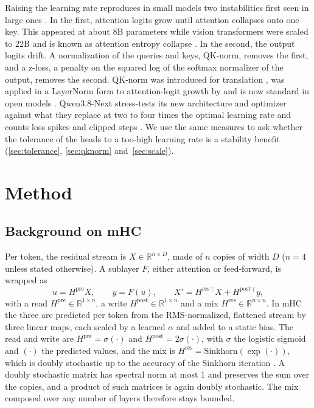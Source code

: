 \documentclass[11pt, a4paper]{article}
\newcommand{\Hpre}{H^{\mathrm{pre}}}
\newcommand{\Hpost}{H^{\mathrm{post}}}
\newcommand{\Hres}{H^{\mathrm{res}}}
\begin{document}
Raising the learning rate reproduces in small models two instabilities first seen in large ones \citep{wortsman2023proxies}. In
the first, attention logits grow until attention collapses onto one key. This appeared at about 8B parameters while vision
transformers were scaled to 22B \citep{dehghani2023vit22b} and is known as attention entropy collapse
\citep{zhai2023entropycollapse}. In the second, the output logits drift. A normalization of the queries and keys, QK-norm, removes
the first, and a z-loss, a penalty on the squared log of the softmax normalizer of the output, removes the second. QK-norm was introduced for translation \citep{henry2020qknorm}, was applied in a LayerNorm form
to attention-logit growth by \citet{dehghani2023vit22b} and is now standard in open models \citep{olmo2024olmo2, gemma2025gemma3,
yang2025qwen3}. Qwen3.8-Next stress-tests its new architecture and optimizer against what they replace at two to four
times the optimal learning rate and counts loss spikes and clipped steps \citep{qiu2026qwen38next}. We use the same measures to
ask whether the tolerance of the heads to a too-high learning rate is a stability benefit (\cref{sec:tolerance}, \cref{sec:qknorm}
and~\cref{sec:scale}).

\section{Method}
\label{sec:method}

\subsection{Background on mHC}
\label{sec:mhc}

Per token, the residual stream is $X \in \mathbb{R}^{n \times D}$, made of $n$ copies of width $D$ ($n = 4$ unless stated
otherwise). A sublayer $F$, either attention or feed-forward, is wrapped as
\begin{equation}
  u = \Hpre X, \qquad y = F(u), \qquad X' = \Hres{}^{\top} X + \Hpost{}^{\top} y,
  \label{eq:mhc}
\end{equation}
with a read $\Hpre \in \mathbb{R}^{1 \times n}$, a write $\Hpost \in \mathbb{R}^{1 \times n}$ and a mix $\Hres \in \mathbb{R}^{n
\times n}$. In mHC the three are predicted per token from the RMS-normalized, flattened stream by three linear maps, each scaled
by a learned $\alpha$ and added to a static bias. The read and write are $\Hpre = \sigma(\cdot)$ and $\Hpost = 2\sigma(\cdot)$,
with $\sigma$ the logistic sigmoid and $(\cdot)$ the predicted values, and the mix is $\Hres = \mathrm{Sinkhorn}(\exp(\cdot))$,
which is doubly stochastic up to the accuracy of the Sinkhorn iteration \citep{xie2026mhc}. A
doubly stochastic matrix has spectral norm at most 1 and preserves the sum over the copies, and a product of such matrices is
again doubly stochastic. The mix composed over any number of layers therefore stays bounded.
\end{document}
